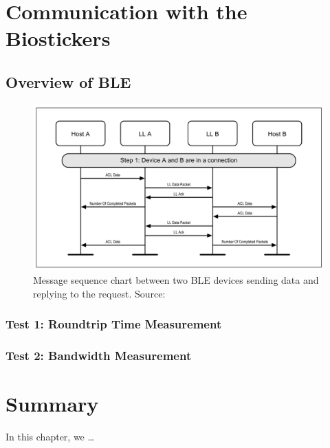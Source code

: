 \section{Communication with the Biostickers}

\subsection{Overview of \acf{BLE}}

\begin{figure}[H]
    \centering
    \includegraphics[width=\linewidth]{images/ble-sending-data.PNG}
    \caption[Message sequence chart between two \acs{BLE} devices sending data and replying to the request.]{Message sequence chart between two \acs{BLE} devices sending data and replying to the request. Source: \cite{Specification1999}}
    \label{fig:differences-between-cloud-services}
\end{figure}


\subsubsection{Test 1: Roundtrip Time Measurement}

\subsubsection{Test 2: Bandwidth Measurement}


\section{Summary}
In this chapter, we \dots